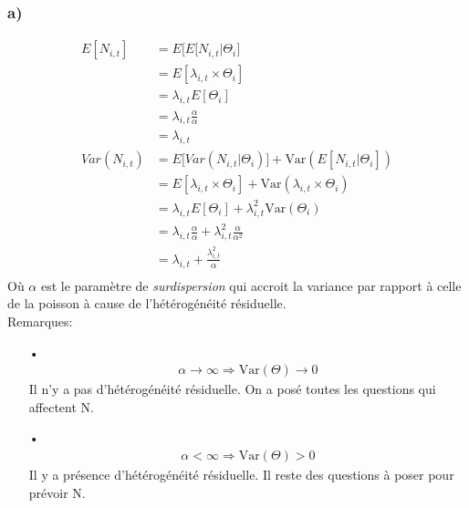 \documentclass[11pt,french]{report}
\begin{document}
\subsubsection*{a)}
\begin{align*}
E[N_{i,t}] &= E \Big[E[N_{i,t}|\Theta_i \Big] \\
&= E[\lambda_{i,t} \times \Theta_i]\\
&= \lambda_{i,t}E[\Theta_i] \\
&= \lambda_{i,t} \frac{\alpha}{\alpha}\\
&=\lambda_{i,t} \\
Var(N_{i,t}) &= E\Big[Var(N_{i,t}|\Theta_i )\Big] + \text{Var}(E[N_{i,t}|\Theta_i])\\
&= E[\lambda_{i,t} \times \Theta_i] + \text{Var}(\lambda_{i,t} \times \Theta_i)\\
&= \lambda_{i,t} E[ \Theta_i] + \lambda_{i,t}^2\text{Var}(\Theta_i)\\
&= \lambda_{i,t} \frac{\alpha}{\alpha} + \lambda_{i,t}^2 \frac{\alpha}{\alpha^2}\\
&= \lambda_{i,t}  +  \frac{\lambda_{i,t}^2}{\alpha}\\
\end{align*}
Où $\alpha$ est le paramètre de \emph{surdispersion} qui accroit la variance par rapport à celle de la poisson à cause de l'hétérogénéité résiduelle. 
\\
Remarques:
\begin{itemize}
\item[•] \begin{align*}
\alpha \rightarrow \infty \Rightarrow \text{Var}(\Theta) \rightarrow 0
\end{align*}
Il n'y a pas d'hétérogénéité résiduelle. On a posé toutes les questions qui affectent N.
\\

\item[•] \begin{align*}
\alpha < \infty \Rightarrow \text{Var}(\Theta) > 0
\end{align*}
Il y a présence d'hétérogénéité résiduelle. Il reste des questions à poser pour prévoir N.
\end{itemize}
\end{document}
